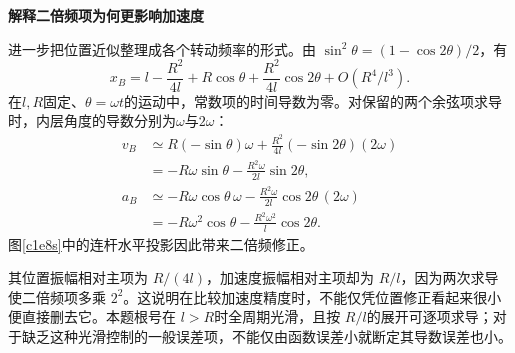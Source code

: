 \begin{solution}
\par\medskip{}\noindent\textbf{解释二倍频项为何更影响加速度}\par\nobreak
进一步把位置近似整理成各个转动频率的形式。由 $\sin^2\theta=(1-\cos2\theta)/2$，有
\[x_B=l-\frac{R^2}{4l}+R\cos\theta+\frac{R^2}{4l}\cos2\theta
       +O(R^4/l^3).\]
在$l,R$固定、$\theta=\omega t$的运动中，常数项的时间导数为零。对保留的两个余弦项求导时，内层角度的导数分别为$\omega$与$2\omega$：
\begin{align*}
v_B&\simeq R(-\sin\theta)\omega
       +\frac{R^2}{4l}(-\sin2\theta)(2\omega)\\
   &=-R\omega\sin\theta-\frac{R^2\omega}{2l}\sin2\theta,\\
a_B&\simeq-R\omega\cos\theta\,\omega
       -\frac{R^2\omega}{2l}\cos2\theta\,(2\omega)\\
   &=-R\omega^2\cos\theta-\frac{R^2\omega^2}{l}\cos2\theta.
\end{align*}
图\ref{c1e8s}中的连杆水平投影因此带来二倍频修正。

其位置振幅相对主项为 $R/(4l)$，加速度振幅相对主项却为 $R/l$，因为两次求导使二倍频项多乘 $2^2$。这说明在比较加速度精度时，不能仅凭位置修正看起来很小便直接删去它。本题根号在 $l>R$时全周期光滑，且按 $R/l$的展开可逐项求导；对于缺乏这种光滑控制的一般误差项，不能仅由函数误差小就断定其导数误差也小。
\end{solution}

